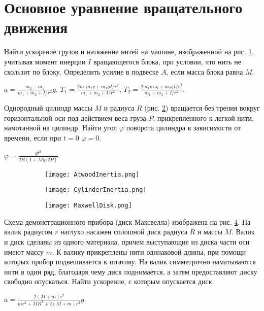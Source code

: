 \section{Основное уравнение вращательного движения}

\introProblems

\begin{ex} %
Найти ускорение грузов и натяжение нитей на машине, изображенной на рис. \ref{AtwoodInertia}, учитывая момент инерции $I$ вращающегося блока, при условии, что нить не скользит по блоку. Определить усилие в подвеске $A$, если масса блока равна $M$.
\begin{ans}
$a= \frac{m_2-m_1}{m_1+m_2+I/r^2}g$, $T_1 = \frac{2m_1m_2g + m_1gI/r^2}{m_1+m_2+I/r^2}$, $T_2 = \frac{2m_1m_2g + m_2gI/r^2}{m_1+m_2+I/r^2}$.
\end{ans}
\end{ex}	

\begin{ex}  %
Однородный цилиндр массы $M$ и радиуса $R$ (рис. \ref{CylinderInertia}) вращается без трения вокруг горизонтальной оси под действием веса груза $P$, прикрепленного к легкой нити, намотанной на цилиндр. Найти угол $\varphi$ поворота цилиндра в зависимости от времени, если при $t = 0$ $\varphi = 0$.
\begin{ans}
$\varphi = \frac{gt^2}{2R(1+Mg/2P)}$.
\end{ans}
\end{ex}	

\begin{figure}[h]
\centering
\begin{subfigure}{.33\textwidth}
  \centering
\texttt{[image: AtwoodInertia.png]}
\caption{}
\label{AtwoodInertia}
\end{subfigure}%
\begin{subfigure}{.33\textwidth}
  \centering
\texttt{[image: CylinderInertia.png]}
\caption{}
\label{CylinderInertia}
\end{subfigure}
\begin{subfigure}{.33\textwidth}
  \centering
\texttt{[image: MaxwellDisk.png]}
\caption{}
\label{MaxwellDisk}
\end{subfigure}
\caption{}
\end{figure}

\begin{ex} %
Схема демонстрационного прибора (диск Максвелла) изображена на рис. \ref{MaxwellDisk}. На валик радиусом $r$ наглухо насажен сплошной диск радиуса $R$ и массы $M$. Валик и диск сделаны из одного материала, причем выступающие из диска части оси имеют массу $m$. К валику прикреплены нити одинаковой длины, при помощи которых прибор подвешивается к штативу. На валик симметрично наматываются нити в один ряд, благодаря чему диск поднимается, а затем предоставляют диску свободно опускаться. Найти ускорение, с которым опускается диск.
\begin{ans}
$a = \frac{2(M+m)r^2}{mr^2+MR^2+2(M+m)r^2}g$.
\end{ans}
\end{ex}	

